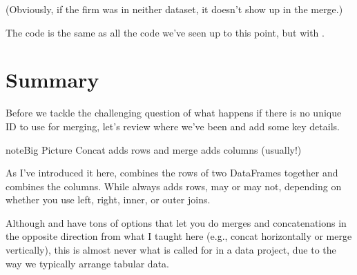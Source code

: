 \documentclass[letterpaper,10pt,english]{sphinxmanual}
\begin{document}
(Obviously, if the firm was in neither dataset, it doesn’t show up in the merge.)

The code is the same as all the code we’ve seen up to this point, but with .

\begin{sphinxVerbatim}[commandchars=\\\{\}]
       
\end{sphinxVerbatim}


\section{Summary}
\label{\detokenize{chapter-12-concat-and-merge:summary}}
Before we tackle the challenging question of what happens if there is no unique ID to use for merging, let’s review where we’ve been and add some key details.

\begin{sphinxadmonition}{note}{Big Picture \sphinxhyphen{} Concat adds rows and merge adds columns (usually!)}

As I’ve introduced it here,  combines the rows of two DataFrames together and  combines the columns.  While  always adds rows,  may or may not, depending on whether you use left, right, inner, or outer joins.

Although  and  have tons of options that let you do merges and concatenations in the opposite direction from what I taught here (e.g., concat horizontally or merge vertically), this is almost never what is called for in a data project, due to the way we typically arrange tabular data.
\end{sphinxadmonition}
\end{document}
